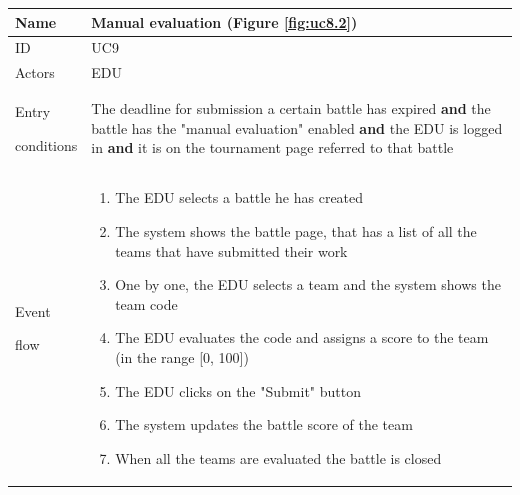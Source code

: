 \begin{center}
    \def\arraystretch{1.5}
    \begin{tabular}{| m{2cm} | m{10cm}|}
        \hline
        Name                  & Manual evaluation (Figure \ref{fig:uc8.2})                                                                                                                                                                                                       \\ \hline
        ID                    & UC9                                                                                                                                                                                                                      \\ \hline
        Actors                & EDU                                                                                                                                                                                                                      \\ \hline
        Entry \par conditions & The deadline for submission a certain battle has expired \textbf{and} the battle has the "manual evaluation" enabled \textbf{and} the EDU is logged in \textbf{and} it is on the tournament page referred to that battle \\ \hline
        Event \par flow       & \begin{enumerate}
                                    \item The EDU selects a battle he has created
                                    \item The system shows the battle page, that has a list of all the teams that have submitted their work
                                    \item One by one, the EDU selects a team and the system shows the team code
                                    \item The EDU evaluates the code and assigns a score to the team (in the range [0, 100])
                                    \item The EDU clicks on the "Submit" button
                                    \item The system updates the battle score of the team
                                    \item When all the teams are evaluated the battle is closed

\end{enumerate}
\end{tabular}
\end{center}
